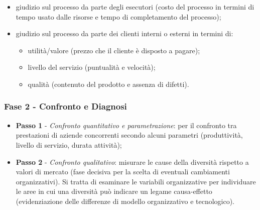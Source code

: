 \documentclass[a4paper, notitlepage, 9pt]{extreport}
\begin{document}
\begin{itemize}
	\begin{itemize}
		\item giudizio sul processo da parte degli esecutori (costo del processo in termini di tempo usato dalle risorse e tempo di completamento del processo);
		\item giudizio sul processo da parte dei clienti interni o esterni in termini di:
		\begin{itemize}
			\item utilità/valore (prezzo che il cliente è disposto a pagare);
			\item livello del servizio (puntualità e velocità);
			\item qualità (contenuto del prodotto e assenza di difetti).
		\end{itemize}
	\end{itemize}
\end{itemize}

\subsubsection*{Fase 2 - Confronto e Diagnosi}
\begin{itemize}
	\item \textbf{Passo 1} - \textit{Confronto quantitativo e parametrazione}: per il confronto tra prestazioni di aziende concorrenti secondo alcuni parametri (produttività, livello di servizio, durata attività);
	\item \textbf{Passo 2} - \textit{Confronto qualitativo}: misurare le cause della diversità rispetto a valori di mercato (fase decisiva per la scelta di eventuali cambiamenti organizzativi). Si tratta di esaminare le variabili organizzative per individuare le aree in cui una diversità può indicare un legame causa-effetto (evidenziazione delle differenze di modello organizzativo e tecnologico).
\end{itemize}
\end{document}
